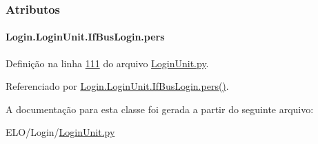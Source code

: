\subsubsection{Atributos}
\hypertarget{classLogin_1_1LoginUnit_1_1IfBusLogin_a53b8075436052b94282021c84a2c3211}{
\paragraph[{pers}]{\setlength{\rightskip}{0pt plus 5cm}Login.\-Login\-Unit.\-If\-Bus\-Login.\-pers}}\label{classLogin_1_1LoginUnit_1_1IfBusLogin_a53b8075436052b94282021c84a2c3211}


Definição na linha \hyperlink{LoginUnit_8py_source_l00111}{111} do arquivo \hyperlink{LoginUnit_8py_source}{Login\-Unit.\-py}.



Referenciado por \hyperlink{classLogin_1_1LoginUnit_1_1IfBusLogin_a807b0a5d5bdae58087feb9d810a6538d}{Login.\-Login\-Unit.\-If\-Bus\-Login.\-pers()}.



A documentação para esta classe foi gerada a partir do seguinte arquivo\-:\begin{DoxyCompactItemize}
\item 
E\-L\-O/\-Login/\hyperlink{LoginUnit_8py}{Login\-Unit.\-py}\end{DoxyCompactItemize}
